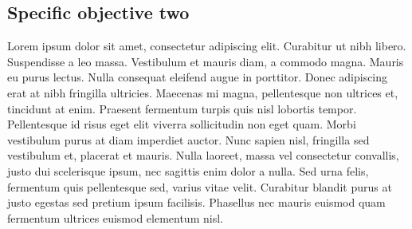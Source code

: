 \subsection{Specific objective two}

Lorem ipsum dolor sit amet, consectetur adipiscing elit. Curabitur ut nibh libero. Suspendisse a leo massa. Vestibulum et mauris diam, a commodo magna. Mauris eu purus lectus. Nulla consequat eleifend augue in porttitor. Donec adipiscing erat at nibh fringilla ultricies. Maecenas mi magna, pellentesque non ultrices et, tincidunt at enim. Praesent fermentum turpis quis nisl lobortis tempor. Pellentesque id risus eget elit viverra sollicitudin non eget quam. Morbi vestibulum purus at diam imperdiet auctor. Nunc sapien nisl, fringilla sed vestibulum et, placerat et mauris. Nulla laoreet, massa vel consectetur convallis, justo dui scelerisque ipsum, nec sagittis enim dolor a nulla. Sed urna felis, fermentum quis pellentesque sed, varius vitae velit. Curabitur blandit purus at justo egestas sed pretium ipsum facilisis. Phasellus nec mauris euismod quam fermentum ultrices euismod elementum nisl.